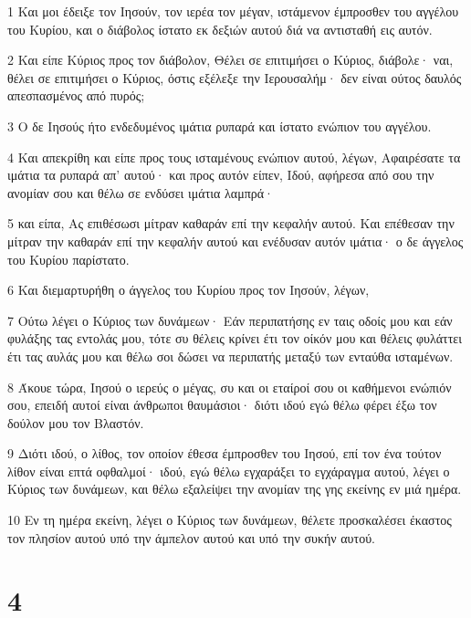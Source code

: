 \par 1 Και μοι έδειξε τον Ιησούν, τον ιερέα τον μέγαν, ιστάμενον έμπροσθεν του αγγέλου του Κυρίου, και ο διάβολος ίστατο εκ δεξιών αυτού διά να αντισταθή εις αυτόν.
\par 2 Και είπε Κύριος προς τον διάβολον, Θέλει σε επιτιμήσει ο Κύριος, διάβολε· ναι, θέλει σε επιτιμήσει ο Κύριος, όστις εξέλεξε την Ιερουσαλήμ· δεν είναι ούτος δαυλός απεσπασμένος από πυρός;
\par 3 Ο δε Ιησούς ήτο ενδεδυμένος ιμάτια ρυπαρά και ίστατο ενώπιον του αγγέλου.
\par 4 Και απεκρίθη και είπε προς τους ισταμένους ενώπιον αυτού, λέγων, Αφαιρέσατε τα ιμάτια τα ρυπαρά απ' αυτού· και προς αυτόν είπεν, Ιδού, αφήρεσα από σου την ανομίαν σου και θέλω σε ενδύσει ιμάτια λαμπρά·
\par 5 και είπα, Ας επιθέσωσι μίτραν καθαράν επί την κεφαλήν αυτού. Και επέθεσαν την μίτραν την καθαράν επί την κεφαλήν αυτού και ενέδυσαν αυτόν ιμάτια· ο δε άγγελος του Κυρίου παρίστατο.
\par 6 Και διεμαρτυρήθη ο άγγελος του Κυρίου προς τον Ιησούν, λέγων,
\par 7 Ούτω λέγει ο Κύριος των δυνάμεων· Εάν περιπατήσης εν ταις οδοίς μου και εάν φυλάξης τας εντολάς μου, τότε συ θέλεις κρίνει έτι τον οίκόν μου και θέλεις φυλάττει έτι τας αυλάς μου και θέλω σοι δώσει να περιπατής μεταξύ των ενταύθα ισταμένων.
\par 8 Άκουε τώρα, Ιησού ο ιερεύς ο μέγας, συ και οι εταίροί σου οι καθήμενοι ενώπιόν σου, επειδή αυτοί είναι άνθρωποι θαυμάσιοι· διότι ιδού εγώ θέλω φέρει έξω τον δούλον μου τον Βλαστόν.
\par 9 Διότι ιδού, ο λίθος, τον οποίον έθεσα έμπροσθεν του Ιησού, επί τον ένα τούτον λίθον είναι επτά οφθαλμοί· ιδού, εγώ θέλω εγχαράξει το εγχάραγμα αυτού, λέγει ο Κύριος των δυνάμεων, και θέλω εξαλείψει την ανομίαν της γης εκείνης εν μιά ημέρα.
\par 10 Εν τη ημέρα εκείνη, λέγει ο Κύριος των δυνάμεων, θέλετε προσκαλέσει έκαστος τον πλησίον αυτού υπό την άμπελον αυτού και υπό την συκήν αυτού.

\chapter{4}


